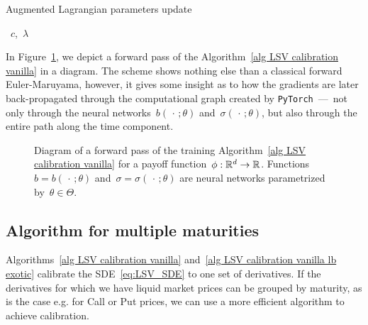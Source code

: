 \begin{algorithm}[htb]\caption{Augmented Lagrangian parameters update \cite{Hestenes1969MultiplierMethods}}\label{alg LSV Augmented Lagrangian}
\begin{algorithmic}
\RETURN~$c$,~$\lambda$
\end{algorithmic}
\end{algorithm}

In Figure~\ref{fig:forwardpass}, we depict a forward pass of the Algorithm~\ref{alg LSV calibration vanilla} in a diagram. The scheme shows nothing else than a classical forward Euler-Maruyama, however, it gives some insight as to how the gradients are later back-propagated through the computational graph created by \texttt{PyTorch}~\nobreakdash---~not only through the neural networks~$b(\,\cdot\, ;\theta)$ and~$\sigma(\,\cdot\,; \theta)$, but also through the entire path along the time component.

\begin{figure}[H]
    \centering
    
    \caption{Diagram of a forward pass of the training Algorithm~\ref{alg LSV calibration vanilla} for a payoff function~$\phi:\mathbb{R}^d\to \mathbb{R}$. Functions~$b=b(\,\cdot\,;\theta)$ and~$\sigma=\sigma(\,\cdot\,;\theta)$ are neural networks parametrized by~$\theta\in\Theta$.}\label{fig:forwardpass}
\end{figure}

\subsection{Algorithm for multiple maturities}\label{sec many maturities}

Algorithms~\ref{alg LSV calibration vanilla} and~\ref{alg LSV calibration vanilla lb exotic}
calibrate the SDE~\eqref{eq:LSV_SDE} to one set of derivatives. 
If the derivatives for which we have liquid market prices can be grouped by  
maturity, as is the case e.g. for Call or Put prices, we
can use a more efficient algorithm to achieve calibration. 
 
